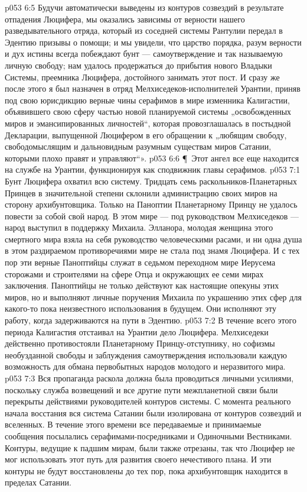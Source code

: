 \vs p053 6:5 Будучи автоматически выведены из контуров созвездий в результате отпадения Люцифера, мы оказались зависимы от верности нашего разведывательного отряда, который из соседней системы Рантулии передал в Эдентию призывы о помощи; и мы увидели, что царство порядка, разум верности и дух истины всегда побеждают бунт --- самоутверждение и так называемую личную свободу; нам удалось продержаться до прибытия нового Владыки Системы, преемника Люцифера, достойного занимать этот пост. И сразу же после этого я был назначен в отряд Мелхиседеков\hyp{}исполнителей Урантии, приняв под свою юрисдикцию верные чины серафимов в мире изменника Калигастии, объявившего свою сферу частью новой планируемой системы „освобожденных миров и эмансипированных личностей“, которая провозглашалась в постыдной Декларации, выпущенной Люцифером в его обращении к „любящим свободу, свободомыслящим и дальновидным разумным существам миров Сатании, которыми плохо правят и управляют“».
\vs p053 6:6 \P\ Этот ангел все еще находится на службе на Урантии, функционируя как сподвижник главы серафимов.
\vs p053 7:1 Бунт Люцифера охватил всю систему. Тридцать семь раскольников\hyp{}Планетарных Принцев в значительной степени склонили администрацию своих миров на сторону архибунтовщика. Только на Паноптии Планетарному Принцу не удалось повести за собой свой народ. В этом мире --- под руководством Мелхиседеков --- народ выступил в поддержку Михаила. Элланора, молодая женщина этого смертного мира взяла на себя руководство человеческими расами, и ни одна душа в этом раздираемом противоречиями мире не стала под знамя Люцифера. И с тех пор эти верные Паноптийцы служат в седьмом переходном мире Иерусема сторожами и строителями на сфере Отца и окружающих ее семи мирах заключения. Паноптийцы не только действуют как настоящие опекуны этих миров, но и выполняют личные поручения Михаила по украшению этих сфер для какого\hyp{}то пока неизвестного использования в будущем. Они исполняют эту работу, когда задерживаются на пути в Эдентию.
\vs p053 7:2 В течение всего этого периода Калигастия отстаивал на Урантии дело Люцифера. Мелхиседеки действенно противостояли Планетарному Принцу\hyp{}отступнику, но софизмы необузданной свободы и заблуждения самоутверждения использовали каждую возможность для обмана первобытных народов молодого и неразвитого мира.
\vs p053 7:3 Вся пропаганда раскола должна была проводиться личными усилиями, поскольку служба возвещений и все другие пути межпланетной связи были перекрыты действиями руководителей контуров системы. С момента реального начала восстания вся система Сатании были изолирована от контуров созвездий и вселенных. В течение этого времени все передаваемые и принимаемые сообщения посылались серафимами\hyp{}посредниками и Одиночными Вестниками. Контуры, ведущие к падшим мирам, были также отрезаны, так что Люцифер не мог использовать этот путь для развития своего нечестивого плана. И эти контуры не будут восстановлены до тех пор, пока архибунтовщик находится в пределах Сатании.

